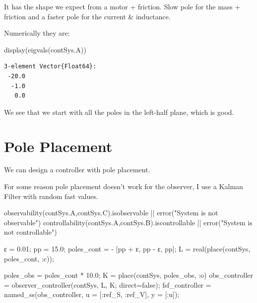 \documentclass[
  8pt,
  a4paper,
]{book}
\newenvironment{Shaded}{\begin{snugshade}}{\end{snugshade}}
\newcommand{\ConstantTok}[1]{\textcolor[rgb]{0.56,0.35,0.01}{#1}}
\newcommand{\FloatTok}[1]{\textcolor[rgb]{0.68,0.00,0.00}{#1}}
\newcommand{\FunctionTok}[1]{\textcolor[rgb]{0.28,0.35,0.67}{#1}}
\newcommand{\NormalTok}[1]{\textcolor[rgb]{0.00,0.23,0.31}{#1}}
\newcommand{\OperatorTok}[1]{\textcolor[rgb]{0.37,0.37,0.37}{#1}}
\newcommand{\StringTok}[1]{\textcolor[rgb]{0.13,0.47,0.30}{#1}}
\begin{document}
It has the shape we expect from a motor + friction. Slow pole for the
mass + friction and a faster pole for the current \& inductance.

Numerically they are:

\begin{Shaded}
\begin{Highlighting}[]
\FunctionTok{display}\NormalTok{(}\FunctionTok{eigvals}\NormalTok{(contSys.A))}
\end{Highlighting}
\end{Shaded}

\begin{verbatim}
3-element Vector{Float64}:
 -20.0
  -1.0
   0.0
\end{verbatim}

We see that we start with all the poles in the left-half plane, which is
good.

\section{Pole Placement}\label{pole-placement-1}

We can design a controller with pole placement.

For some reason pole placement doesn't work for the observer, I use a
Kalman Filter with random fast values.

\begin{Shaded}
\begin{Highlighting}[]
\FunctionTok{observability}\NormalTok{(contSys.A,contSys.C).isobservable }\OperatorTok{||} \FunctionTok{error}\NormalTok{(}\StringTok{"System is not observable"}\NormalTok{)}
\FunctionTok{controllability}\NormalTok{(contSys.A,contSys.B).iscontrollable }\OperatorTok{||} \FunctionTok{error}\NormalTok{(}\StringTok{"System is not controllable"}\NormalTok{)}

\NormalTok{ε }\OperatorTok{=} \FloatTok{0.01}\NormalTok{;}
\NormalTok{pp }\OperatorTok{=} \FloatTok{15.0}\NormalTok{;}
\NormalTok{poles\_cont }\OperatorTok{=} \OperatorTok{{-}}\NormalTok{ [pp }\OperatorTok{+}\NormalTok{ ε, pp }\OperatorTok{{-}}\NormalTok{ ε, pp];}
\NormalTok{L }\OperatorTok{=} \FunctionTok{real}\NormalTok{(}\FunctionTok{place}\NormalTok{(contSys, poles\_cont, }\OperatorTok{:}\NormalTok{c));}


\NormalTok{poles\_obs }\OperatorTok{=}\NormalTok{ poles\_cont }\OperatorTok{*} \FloatTok{10.0}\NormalTok{;}
\NormalTok{K }\OperatorTok{=} \FunctionTok{place}\NormalTok{(contSys, poles\_obs, }\OperatorTok{:}\NormalTok{o)}
\NormalTok{obs\_controller }\OperatorTok{=} \FunctionTok{observer\_controller}\NormalTok{(contSys, L, K; direct}\OperatorTok{=}\ConstantTok{false}\NormalTok{);}
\NormalTok{fsf\_controller }\OperatorTok{=} \FunctionTok{named\_ss}\NormalTok{(obs\_controller, u }\OperatorTok{=}\NormalTok{ [}\OperatorTok{:}\NormalTok{ref\_S, }\OperatorTok{:}\NormalTok{ref\_V], y }\OperatorTok{=}\NormalTok{ [}\OperatorTok{:}\NormalTok{u]);}
\end{Highlighting}
\end{Shaded}
\end{document}
